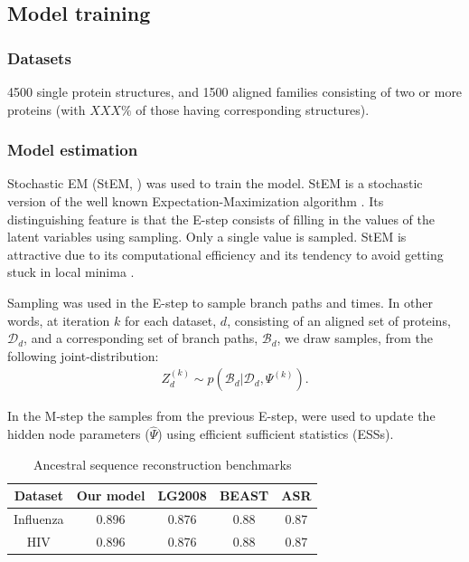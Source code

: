 \documentclass[nogrid]{MBE}%
\begin{document}
\subsection{Model training}

\subsubsection{Datasets}
4500 single protein structures, and 1500 aligned families consisting of two or more proteins (with $XXX\%$ of those having corresponding structures).

\subsubsection{Model estimation}
Stochastic EM (StEM, \citet{gilks1995markov}) was used to train the model. StEM  is a stochastic version of the well known Expectation-Maximization algorithm \citep{gilks1995markov}. Its distinguishing feature is that the E-step consists of filling in the values of the latent variables using sampling. Only a single value is sampled. StEM is attractive due to its computational efficiency and its tendency to avoid getting stuck in local minima \citep{gilks1995markov}.

Sampling was used in the E-step to sample branch paths and times. In other words, at iteration $k$ for each dataset, $d$, consisting of an aligned set of proteins, $\mathcal{D}_d$,  and a corresponding set of branch paths, $\mathcal{B}_d$, we draw samples, from the following joint-distribution:
\begin{align*}
Z_{d}^{(k)}\sim p(\mathcal{B}_d|\mathcal{D}_d,\Psi^{(k)}).
\end{align*}

In the M-step the samples from the previous E-step, were used to update the hidden node parameters ($\hat{\Psi}$) using efficient sufficient statistics (ESSs).



\begin{table}
	\captionsetup{justification=centering}
	\caption{\label{tab:sequencereconstruction} Ancestral sequence reconstruction benchmarks}	
	\begin{tabularx}{1.0\linewidth}{ccccc}
	\toprule
	Dataset & Our model & LG2008 & BEAST & ASR\\
	\midrule
	\rowcolor{black!20} Influenza & 0.896 & 0.876 & 0.88 & 0.87\tabularnewline
	HIV & 0.896 & 0.876 & 0.88 & 0.87\tabularnewline
	\bottomrule
	\end{tabularx}
\end{table}
\end{document}
